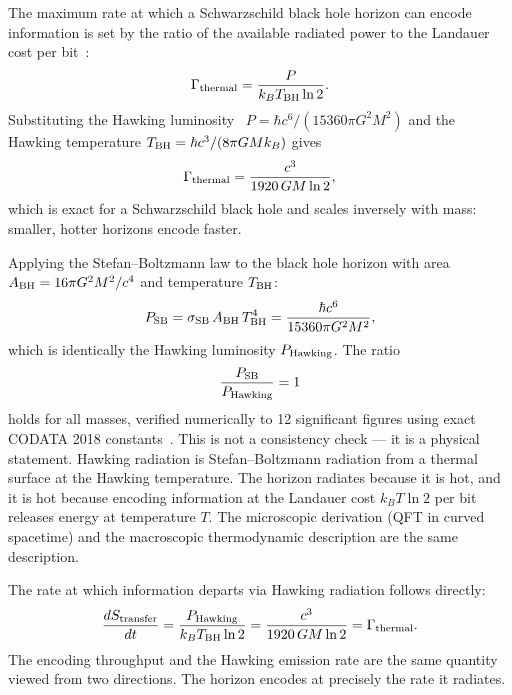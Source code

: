 \documentclass[twocolumn,a4paper,aps,prd,twocolumn,showpacs,notitlepage,superscriptaddress,nofootinbib]{article}
\begin{document}
The maximum rate at which a Schwarzschild black hole horizon can encode
information is set by the ratio of the available radiated power to the
Landauer cost per bit~\citep{Landauer1961}:
\begin{equation}
  \Gamma_{\rm thermal} = \frac{P}{k_B T_{\rm BH} \ln 2}.
  \label{eq:throughput}
\end{equation}
Substituting the Hawking luminosity~\citep{Hawking1975}
$P = \hbar c^6 / (15360\pi G^2 M^2)$ and the Hawking temperature
$T_{\rm BH} = \hbar c^3 / (8\pi G M k_B)$ gives
\begin{equation}
  \Gamma_{\rm thermal} = \frac{c^3}{1920\,G M \ln 2},
  \label{eq:throughput_result}
\end{equation}
which is exact for a Schwarzschild black hole and scales inversely with
mass: smaller, hotter horizons encode faster.

Applying the Stefan--Boltzmann law to the black hole horizon with area
$A_{\rm BH} = 16\pi G^2 M^2 / c^4$ and temperature $T_{\rm BH}$:
\begin{equation}
  P_{\rm SB} = \sigma_{\rm SB}\,A_{\rm BH}\,T_{\rm BH}^4
  = \frac{\hbar c^6}{15360\pi G^2 M^2},
  \label{eq:psb}
\end{equation}
which is identically the Hawking luminosity $P_{\rm Hawking}$.  The ratio
\begin{equation}
  \frac{P_{\rm SB}}{P_{\rm Hawking}} = 1
  \label{eq:sbh_identity}
\end{equation}
holds for all masses, verified numerically to 12 significant figures using
exact CODATA 2018 constants~\citep{Mahaffey2026bh}.  This is not a
consistency check --- it is a physical statement.  Hawking radiation is
Stefan--Boltzmann radiation from a thermal surface at the Hawking
temperature.  The horizon radiates because it is hot, and it is hot because
encoding information at the Landauer cost $k_B T \ln 2$ per bit releases
energy at temperature $T$.  The microscopic derivation (QFT in curved
spacetime) and the macroscopic thermodynamic description are the same
description.

The rate at which information departs via Hawking radiation follows directly:
\begin{equation}
  \frac{dS_{\rm transfer}}{dt} = \frac{P_{\rm Hawking}}{k_B T_{\rm BH} \ln 2}
  = \frac{c^3}{1920\,G M \ln 2} = \Gamma_{\rm thermal}.
  \label{eq:transfer_rate}
\end{equation}
The encoding throughput and the Hawking emission rate are the same quantity
viewed from two directions.  The horizon encodes at precisely the rate it
radiates.
\end{document}
